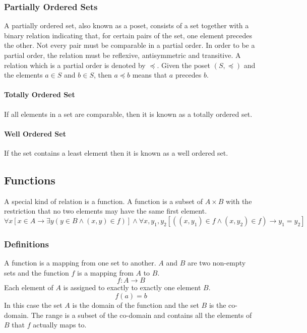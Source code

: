 \documentclass[a4paper, 10pt]{article}
\begin{document}
\subsubsection{Partially Ordered Sets}
A partially ordered set, also known as a poset, consists of a set together with a binary relation indicating that, for certain pairs of the set, one element precedes the other. Not every pair must be comparable in a partial order. In order to be a partial order, the relation must be reflexive, antisymmetric and transitive. A relation which is a partial order is denoted by \(\preceq\). Given the poset \((S,\preceq)\) and the elements \(a\in S\) and \(b\in S\), then \( a\preceq b\) means that \(a\) precedes \(b\).
\paragraph{Totally Ordered Set}
If all elements in a set are comparable, then it is known as a totally ordered set.
\paragraph{Well Ordered Set}
If the set contains a least element then it is known as a well ordered set.

\subsection{Functions}
A special kind of relation is a function. A function is a subset of \(A\times B\) with the restriction that no two elements may have the same first element.
\[ \forall x\left[x\in A\rightarrow \exists y\left(y\in B\land (x,y)\in f\right)\right] \land \forall x,y_1,y_2\left[\left((x,y_1)\in f\land(x,y_2)\in f\right)\rightarrow y_1 = y_2 \right] \]
\subsubsection{Definitions}
A function is a mapping from one set to another. \(A\) and \(B\) are two non-empty sets and the function \(f\) is a mapping from \(A\) to \(B\).
\[f:A\rightarrow B\]
Each element of \(A\) is assigned to exactly to exactly one element \(B\).
\[f(a) = b\]
In this case the set \(A\) is the domain of the function and the set \(B\) is the co-domain. The range is a subset of the co-domain and contains all the elements of \(B\) that \(f\) actually maps to.
\end{document}
